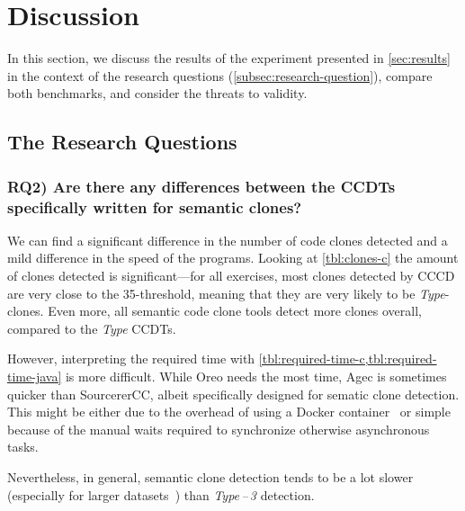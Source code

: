 \documentclass[10pt,journal,compsoc]{IEEEtran}
\def\T#1{\textsl{Type\nobreakdash-#1}}
\begin{document}
\section{Discussion}\label{sec:discussion}
In this section, we discuss the results of the experiment presented in \cref{sec:results} in the context of the research questions (\cref{subsec:research-question}), compare both benchmarks, and consider the threats to validity.

\subsection{The Research Questions}

\subsubsection{RQ2) Are there any differences between the CCDTs specifically written for semantic clones?}
We can find a significant difference in the number of code clones detected and a mild difference in the speed of the programs.
Looking at \cref{tbl:clones-c} the amount of clones detected is significant---for all exercises, most clones detected by CCCD are very close to the \num{35}-threshold, meaning that they are very likely to be \T4-clones.
Even more, all semantic code clone tools detect more clones overall, compared to the \T3 CCDTs.

However, interpreting the required time with \cref{tbl:required-time-c,tbl:required-time-java} is more difficult.
While Oreo needs the most time, Agec is sometimes quicker than SourcererCC, albeit specifically designed for sematic clone detection.
This might be either due to the overhead of using a Docker container~\cite{li2017performance} or
simple because of the manual waits required to synchronize otherwise asynchronous tasks.

Nevertheless, in general, semantic clone detection tends to be a lot slower (especially for larger datasets~\cite{SourcererCC}) than \T{1\,--\,3} detection.
\end{document}
